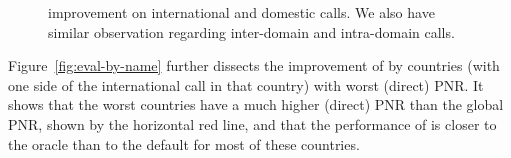 \begin{figure}[t!]
\centering
\caption{\hybrid improvement on international and domestic calls. 
We also have similar observation regarding inter-domain and intra-domain calls.}
\label{fig:eval-inter-intra}
\end{figure}


Figure~\ref{fig:eval-by-name} further dissects the improvement of \hybrid by countries (with one side of the international call in that country) with worst (direct) PNR. It shows that the worst countries have a much higher (direct) PNR than the global PNR, shown by the horizontal red line, and that the performance of \hybrid is closer to the oracle than to the default for most of these countries. 


%

